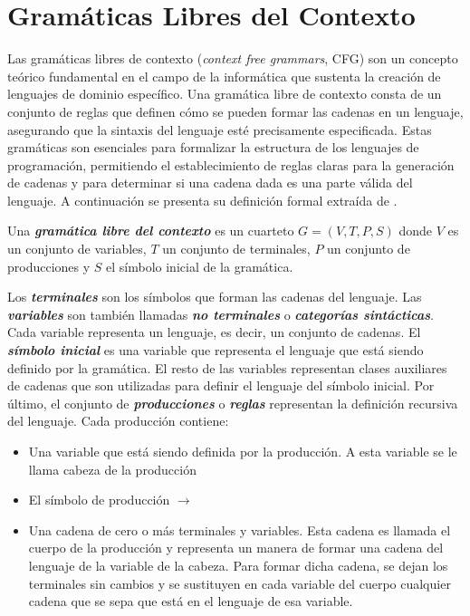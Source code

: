 \section{Gram\'aticas Libres del Contexto}\label{section:freecontenxtgrammar}

Las gramáticas libres de contexto (\emph{context free grammars}, CFG) son un concepto teórico 
fundamental en el campo de la informática que sustenta la creación de lenguajes de dominio específico. 
Una gramática libre de contexto consta de un conjunto de reglas que definen cómo se pueden 
formar las cadenas en un lenguaje, asegurando que la sintaxis del lenguaje esté precisamente especificada. 
Estas gramáticas son esenciales para formalizar la estructura de los lenguajes de programación, permitiendo 
el establecimiento de reglas claras para la generación de cadenas y para determinar si una cadena dada es 
una parte válida del lenguaje. A continuaci\'on se presenta su definici\'on formal 
extra\'ida de \cite{hopcroft_introduction_2007}.

\begin{definition}
    Una \textbf{\textit{gramática libre del contexto}} es un cuarteto $G=(V, T, P, S)$ donde $V$ es un 
    conjunto de variables, $T$ un conjunto de terminales, $P$ un conjunto de producciones y $S$ el símbolo 
    inicial de la gramática.
\end{definition}

Los \textbf{\textit{terminales}} son los símbolos que forman las cadenas del lenguaje. Las \textbf{\textit{variables}} 
son tambi\'en llamadas \textbf{\textit{no terminales}} o \textbf{\textit{categor\'ias sintácticas}}. Cada variable
representa un lenguaje, es decir, un conjunto de cadenas. El \textbf{\textit{símbolo inicial}} es una variable 
que representa el lenguaje que est\'a siendo definido por la gramática. El resto de las variables representan 
clases auxiliares de cadenas que son utilizadas para definir el lenguaje del símbolo inicial. Por \'ultimo, el 
conjunto de \textbf{\textit{producciones}} o \textbf{\textit{reglas}} representan la definici\'on recursiva 
del lenguaje. Cada producción contiene:

\begin{itemize}
    \item Una variable que est\'a siendo definida por la producción. A esta variable se le llama 
        cabeza de la producción
    \item El símbolo de producción $\rightarrow$ 
    \item Una cadena de cero o m\'as terminales y variables. Esta cadena es llamada el cuerpo de la 
        producción y representa un manera de formar una cadena del lenguaje de la variable de la cabeza. Para formar 
        dicha cadena, se dejan los terminales sin cambios y se sustituyen en cada variable del cuerpo cualquier 
        cadena que se sepa que está en el lenguaje de esa variable.
\end{itemize}